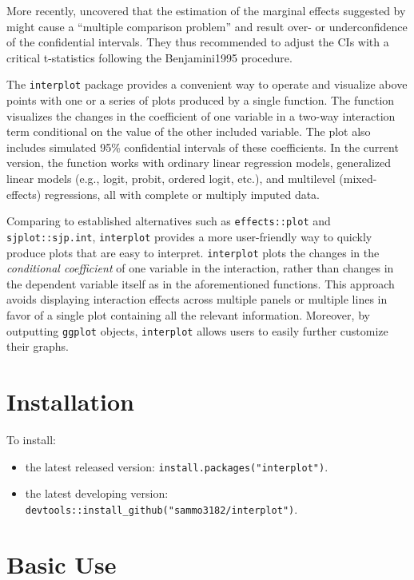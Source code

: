 \documentclass[
  article]{jss}
\begin{document}
More recently, \citep{EsareySumner2018}uncovered that the estimation of
the marginal effects suggested by \citep{BramborClarkGolder2006} might
cause a ``multiple comparison problem'' and result over- or
underconfidence of the confidential intervals. They thus recommended to
adjust the CIs with a critical t-statistics following the Benjamini1995
procedure.

The \texttt{interplot} package provides a convenient way to operate and
visualize above points with one or a series of plots produced by a
single function. The function visualizes the changes in the coefficient
of one variable in a two-way interaction term conditional on the value
of the other included variable. The plot also includes simulated 95\%
confidential intervals of these coefficients. In the current version,
the function works with ordinary linear regression models, generalized
linear models (e.g., logit, probit, ordered logit, etc.), and multilevel
(mixed-effects) regressions, all with complete or multiply imputed data.

Comparing to established alternatives such as \texttt{effects::plot} and
\texttt{sjplot::sjp.int}, \texttt{interplot} provides a more
user-friendly way to quickly produce plots that are easy to interpret.
\texttt{interplot} plots the changes in the \emph{conditional
coefficient} of one variable in the interaction, rather than changes in
the dependent variable itself as in the aforementioned functions. This
approach avoids displaying interaction effects across multiple panels or
multiple lines in favor of a single plot containing all the relevant
information. Moreover, by outputting \texttt{ggplot} objects,
\texttt{interplot} allows users to easily further customize their
graphs.

\hypertarget{sec-installation}{%
\section{Installation}\label{sec-installation}}

To install:

\begin{itemize}
\item
  the latest released version: \texttt{install.packages("interplot")}.
\item
  the latest developing version:
  \texttt{devtools::install\_github("sammo3182/interplot")}.
\end{itemize}

\hypertarget{sec-basic-use}{%
\section{Basic Use}\label{sec-basic-use}}
\end{document}
